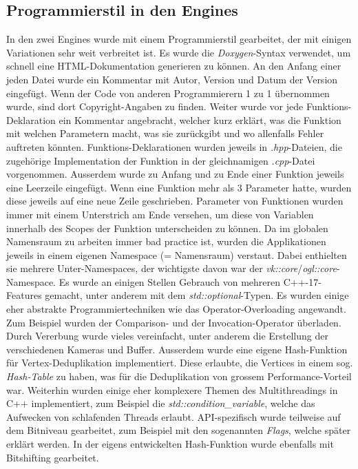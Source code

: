\documentclass[titlepage, 11pt, a4paper, ngerman]{article}
\begin{document}
\subsection{Programmierstil in den Engines}
In den zwei \glspl{Engine} wurde mit einem Programmierstil gearbeitet, der mit einigen Variationen sehr weit verbreitet ist. Es wurde die \textit{Doxygen}-Syntax verwendet, um schnell eine HTML-Dokumentation generieren zu können. An den Anfang einer jeden Datei wurde ein Kommentar mit Autor, Version und Datum der Version eingefügt. Wenn der Code von anderen Programmierern 1 zu 1 übernommen wurde, sind dort Copyright-Angaben zu finden. Weiter wurde vor jede Funktions-Deklaration ein Kommentar angebracht, welcher kurz erklärt, was die Funktion mit welchen Parametern macht, was sie zurückgibt und wo allenfalls Fehler auftreten könnten. Funktions-Deklarationen wurden jeweils in \textit{.hpp}-Dateien, die zugehörige Implementation der Funktion in der gleichnamigen \textit{.cpp}-Datei vorgenommen. Ausserdem wurde zu Anfang und zu Ende einer Funktion jeweils eine Leerzeile eingefügt. Wenn eine Funktion mehr als 3 Parameter hatte, wurden diese jeweils auf eine neue Zeile geschrieben. Parameter von Funktionen wurden immer mit einem Unterstrich am Ende versehen, um diese von Variablen innerhalb des Scopes der Funktion unterscheiden zu können. Da im globalen Namensraum zu arbeiten immer bad practice ist, wurden die Applikationen jeweils in einem eigenen Namespace (= Namensraum) verstaut. Dabei enthielten sie mehrere Unter-Namespaces, der wichtigste davon war der \textit{vk::core}/\textit{ogl::core}-Namespace. Es wurde an einigen Stellen Gebrauch von mehreren C++-17-Features gemacht, unter anderem mit dem \textit{std::optional}-Typen. Es wurden einige eher abstrakte Programmiertechniken wie das Operator-Overloading angewandt. Zum Beispiel wurden der Comparison- und der Invocation-Operator überladen. Durch Vererbung wurde vieles vereinfacht, unter anderem die Erstellung der verschiedenen Kameras und Buffer. Ausserdem wurde eine eigene Hash-Funktion für \gls{Vertex}-Deduplikation implementiert. Diese erlaubte, die \gls{Vertices} in einem sog. \textit{Hash-Table} zu haben, was für die Deduplikation von grossem Performance-Vorteil war. Weiterhin wurden einige eher komplexere Themen des \gls{Multithreading}s in C++ implementiert, zum Beispiel die \textit{std::condition\_variable}, welche das Aufwecken von schlafenden \glspl{Thread} erlaubt. \acrshort{API}-spezifisch wurde teilweise auf dem Bitniveau gearbeitet, zum Beispiel mit den sogenannten \textit{Flags}, welche später erklärt werden. In der eigens entwickelten Hash-Funktion wurde ebenfalls mit Bitshifting gearbeitet.
\end{document}
